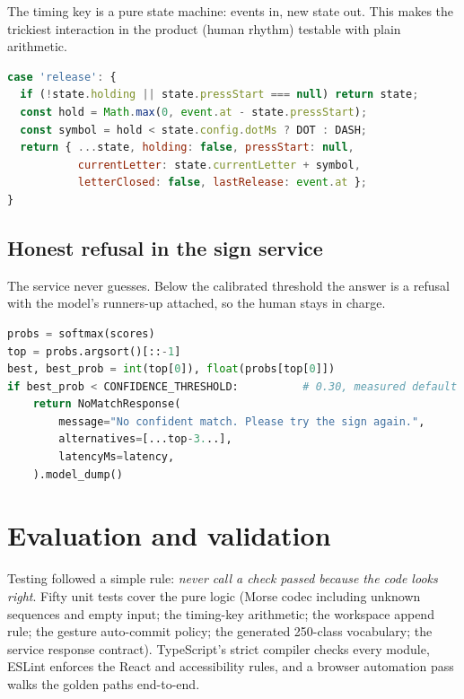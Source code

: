 \documentclass[11pt,a4paper]{article}
\newcommand{\code}[1]{\texttt{#1}}
\begin{document}
The timing key is a pure state machine: events in, new state out. This makes the trickiest interaction in the product (human rhythm) testable with plain arithmetic.

\begin{lstlisting}[language=JavaScript, caption={\code{src/lib/keying.ts} --- a press becomes a dot or a dash; gaps close letters and words.}]
case 'release': {
  if (!state.holding || state.pressStart === null) return state;
  const hold = Math.max(0, event.at - state.pressStart);
  const symbol = hold < state.config.dotMs ? DOT : DASH;
  return { ...state, holding: false, pressStart: null,
           currentLetter: state.currentLetter + symbol,
           letterClosed: false, lastRelease: event.at };
}
\end{lstlisting}

\subsection{Honest refusal in the sign service}

The service never guesses. Below the calibrated threshold the answer is a refusal with the model's runners-up attached, so the human stays in charge.

\begin{lstlisting}[language=Python, caption={\code{mini-services/sign-service/app.py} --- honest low-confidence behaviour.}]
probs = softmax(scores)
top = probs.argsort()[::-1]
best, best_prob = int(top[0]), float(probs[top[0]])
if best_prob < CONFIDENCE_THRESHOLD:          # 0.30, measured default
    return NoMatchResponse(
        message="No confident match. Please try the sign again.",
        alternatives=[...top-3...],
        latencyMs=latency,
    ).model_dump()
\end{lstlisting}

\section{Evaluation and validation}

Testing followed a simple rule: \emph{never call a check passed because the code looks right}. Fifty unit tests cover the pure logic (Morse codec including unknown sequences and empty input; the timing-key arithmetic; the workspace append rule; the gesture auto-commit policy; the generated 250-class vocabulary; the service response contract). TypeScript's strict compiler checks every module, ESLint enforces the React and accessibility rules, and a browser automation pass walks the golden paths end-to-end.
\end{document}
